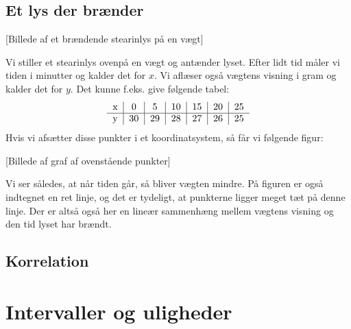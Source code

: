 \documentclass[12pt,oneside,a4paper]{article}
\begin{document}
\subsection{Et lys der brænder}
[Billede af et brændende stearinlys på en vægt]

Vi stiller et stearinlys ovenpå en vægt og antænder lyset. Efter lidt tid måler
vi tiden i minutter og kalder det for $x$. Vi aflæser også vægtens visning i
gram og kalder det for $y$. Det kunne f.eks. give følgende tabel:
$$
\begin{tabular}{c|c|c|c|c|c|c}
    x &  0 &  5 & 10 & 15 & 20 & 25 \\
    \hline
    y & 30 & 29 & 28 & 27 & 26 & 25
\end{tabular}
$$
Hvis vi afsætter disse punkter i et koordinatsystem, så får vi følgende figur:

[Billede af graf af ovenstående punkter]

Vi ser således, at når tiden går, så bliver vægten mindre.
På figuren er også indtegnet en ret linje, og det er tydeligt, at punkterne
ligger meget tæt på denne linje.  Der er altså også her en lineær sammenhæng
mellem vægtens visning og den tid lyset har brændt.

\subsection{Korrelation}
\section{Intervaller og uligheder}
\end{document}
